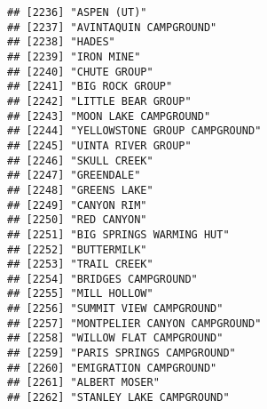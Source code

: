 \documentclass[
]{article}
\begin{document}
\begin{verbatim}
## [2236] "ASPEN (UT)"                                                                          
## [2237] "AVINTAQUIN CAMPGROUND"                                                               
## [2238] "HADES"                                                                               
## [2239] "IRON MINE"                                                                           
## [2240] "CHUTE GROUP"                                                                         
## [2241] "BIG ROCK GROUP"                                                                      
## [2242] "LITTLE BEAR GROUP"                                                                   
## [2243] "MOON LAKE CAMPGROUND"                                                                
## [2244] "YELLOWSTONE GROUP CAMPGROUND"                                                        
## [2245] "UINTA RIVER GROUP"                                                                   
## [2246] "SKULL CREEK"                                                                         
## [2247] "GREENDALE"                                                                           
## [2248] "GREENS LAKE"                                                                         
## [2249] "CANYON RIM"                                                                          
## [2250] "RED CANYON"                                                                          
## [2251] "BIG SPRINGS WARMING HUT"                                                             
## [2252] "BUTTERMILK"                                                                          
## [2253] "TRAIL CREEK"                                                                         
## [2254] "BRIDGES CAMPGROUND"                                                                  
## [2255] "MILL HOLLOW"                                                                         
## [2256] "SUMMIT VIEW CAMPGROUND"                                                              
## [2257] "MONTPELIER CANYON CAMPGROUND"                                                        
## [2258] "WILLOW FLAT CAMPGROUND"                                                              
## [2259] "PARIS SPRINGS CAMPGROUND"                                                            
## [2260] "EMIGRATION CAMPGROUND"                                                               
## [2261] "ALBERT MOSER"                                                                        
## [2262] "STANLEY LAKE CAMPGROUND"                                                             

\end{verbatim}
\end{document}
